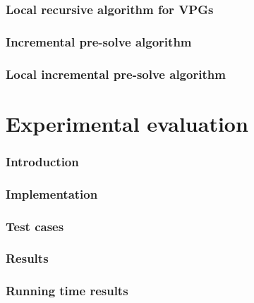 \documentclass[]{article}
\begin{document}
\section{Local recursive algorithm for VPGs}


\section{Incremental pre-solve algorithm}


\section{Local incremental pre-solve algorithm}


\pagebreak
\part{Experimental evaluation}
\section{Introduction}


\section{Implementation}


\section{Test cases}


\section{Results}


\pagebreak
\begin{appendices}
\section{Running time results}
\label{appendix:resultsexact}

\end{appendices}

 

\end{document}
